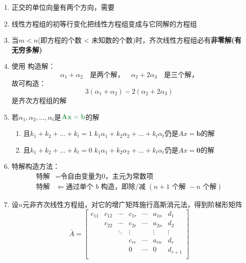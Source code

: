\documentclass[./linear_algebra.tex]{subfiles}
\begin{document}
    \begin{enumerate}
        \item 正交的单位向量有两个方向，需要{\color{red}{加正负号}}
        \item 线性方程组的初等行变化把线性方程组变成与它同解的方程组
        \item 当$m < n$(即方程的个数 < 未知数的个数)时，齐次线性方程组必有\textbf{非零解(有无穷多解)}
        \item 使用 \textbf{\color{red}{最小公约数}} 构造解：
        \[
            \alpha_1 + \alpha_2 \quad \text{是两个解，} \quad
            \alpha_2 + 2\alpha_3 \quad \text{是三个解，}
        \]
        故可构造：
        \[
            3(\alpha_1 + \alpha_2) - 2(\alpha_2 + 2\alpha_3)
        \]是齐次方程组的解
        \item 若$\alpha_1,\alpha_2,\dots,\alpha_t$是$\mathbf{\color[rgb]{0.2, 0.6, 0.3}{Ax = b}}$的解
        \begin{enumerate}
            \item 且$k_1 + k_2 + \dots + k_t = 1$ \Leftrightarrow $k_{1}\alpha_1 + k_{2}\alpha_2 + \dots + k_{t}\alpha_t$仍是$Ax = \mathbf{b}$的解
            \item 且$k_1 + k_2 + \dots + k_t = 0$ \Leftrightarrow $k_{1}\alpha_1 + k_{2}\alpha_2 + \dots + k_{t}\alpha_t$仍是$Ax = \mathbf{0}$的解
        \end{enumerate}
        \item 特解构造方法：
        \[
            \begin{aligned}
                \text{特解} &= \text{令自由变量为0，主元为常数项} \\
                \text{特解} &\Leftarrow \text{通过单个 } b \text{ 构造，即除/减 } (n+1 \text{ 个解 } - n \text{ 个解})
            \end{aligned}
        \]
        \item 设$n$元非齐次线性方程组，对它的增广矩阵施行高斯消元法，得到阶梯形矩阵
        \[
            \bar A =
            \begin{bmatrix}
                c_{11} & c_{12} & \cdots & c_{1r} & \cdots & a_{1n} & d_1     \\
                & c_{22} & \cdots & c_{2r} & \cdots & a_{2n} & d_2     \\
                &        & \ddots & \vdots &        & \vdots & \vdots  \\
                &        &        & c_{rr} & \cdots & a_{rn} & d_r     \\
                &        &        & 0      & \cdots & 0      & d_{r+1} \\

\end{bmatrix}\]
\end{enumerate}
\end{document}
